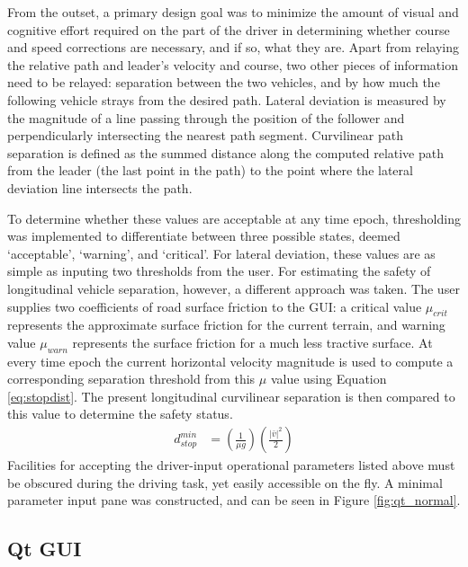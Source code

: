 \documentclass[twocolumn,10pt]{article}
\begin{document}
  From the outset, a primary design goal was to minimize the amount of visual and cognitive effort required on the part of the driver in determining whether course and speed corrections are necessary, and if so, what they are.
  Apart from relaying the relative path and leader's velocity and course, two other pieces of information need to be relayed: separation between the two vehicles, and by how much the following vehicle strays from the desired path.
  Lateral deviation is measured by the magnitude of a line passing through the position of the follower and perpendicularly intersecting the nearest path segment.
  Curvilinear path separation is defined as the summed distance along the computed relative path from the leader (the last point in the path) to the point where the lateral deviation line intersects the path.

  To determine whether these values are acceptable at any time epoch, thresholding was implemented to differentiate between three possible states, deemed `acceptable', `warning', and `critical'.
  For lateral deviation, these values are as simple as inputing two thresholds from the user.  For estimating the safety of longitudinal vehicle separation, however, a different approach was taken.  The user supplies two coefficients of road surface friction to the GUI: a critical value $\mu_{crit}$ represents the approximate surface friction for the current terrain, and warning value $\mu_{warn}$ represents the surface friction for a much less tractive surface.  At every time epoch the current horizontal velocity magnitude is used to compute a corresponding separation threshold from this $\mu$ value using Equation \ref{eq:stopdist}.  The present longitudinal curvilinear separation is then compared to this value to determine the safety status.
  \begin{align} \label{eq:stopdist}
    d_{stop}^{min} &= \left( \frac {1} {\mu g} \right) \left(\frac {|\bar{v}|^2} {2} \right)
  \end{align}  %
  Facilities for accepting the driver-input operational parameters listed above must be obscured during the driving task, yet easily accessible on the fly.  A minimal parameter input pane was constructed, and can be seen in Figure \ref{fig:qt_normal}.


  \subsection*{Qt GUI}
  
\end{document}
